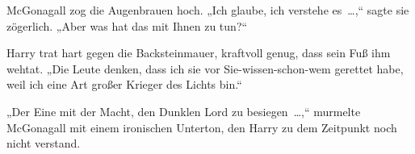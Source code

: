 McGonagall zog die Augenbrauen hoch. „Ich glaube, ich verstehe es …,“ sagte sie zögerlich. „Aber was hat das mit Ihnen zu tun?“

Harry trat hart gegen die Backsteinmauer, kraftvoll genug, dass sein Fuß ihm wehtat. „Die Leute denken, dass ich sie vor Sie-wissen-schon-wem gerettet habe, weil ich eine Art großer Krieger des Lichts bin.“

„Der Eine mit der Macht, den Dunklen Lord zu besiegen …,“ murmelte McGonagall mit einem ironischen Unterton, den Harry zu dem Zeitpunkt noch nicht verstand.

